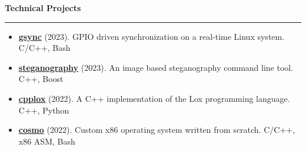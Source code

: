 \documentclass[11pt,letterpaper]{article}
\begin{document}
\medskip

\begin{large}
	\textbf{Technical Projects}
\end{large}

\smallskip \hrule \medskip

\begin{itemize}[topsep=0pt]
	\setlength\itemsep{0.2em}
	\item \textbf{\href{https://github.com/ivan-guerra/gsync.git}{gsync}}
	      (2023). GPIO driven synchronization on a real-time Linux system. C/C++,
	      Bash
	\item \textbf{\href{https://github.com/ivan-guerra/steganography.git}{steganography}}
	      (2023). An image based steganography command line tool. C++, Boost
	\item \textbf{\href{https://github.com/ivan-guerra/cpplox.git}{cpplox}}
	      (2022). A C++ implementation of the Lox programming language. C++,
	      Python
	\item \textbf{
		      \href{https://github.com/ivan-guerra/cosmo.git}{cosmo}}
	      (2022). Custom x86 operating system written from scratch. C/C++, x86
	      ASM, Bash
\end{itemize}
\end{document}
